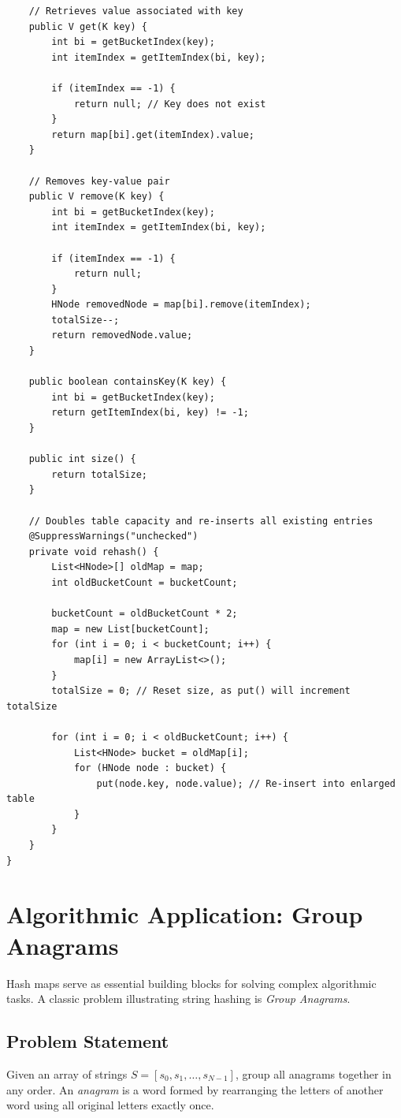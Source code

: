 \documentclass[10pt,journal,compsoc,onecolumn]{IEEEtran}
\begin{document}
\begin{verbatim}
    // Retrieves value associated with key
    public V get(K key) {
        int bi = getBucketIndex(key);
        int itemIndex = getItemIndex(bi, key);

        if (itemIndex == -1) {
            return null; // Key does not exist
        }
        return map[bi].get(itemIndex).value;
    }

    // Removes key-value pair
    public V remove(K key) {
        int bi = getBucketIndex(key);
        int itemIndex = getItemIndex(bi, key);

        if (itemIndex == -1) {
            return null;
        }
        HNode removedNode = map[bi].remove(itemIndex);
        totalSize--;
        return removedNode.value;
    }

    public boolean containsKey(K key) {
        int bi = getBucketIndex(key);
        return getItemIndex(bi, key) != -1;
    }

    public int size() {
        return totalSize;
    }

    // Doubles table capacity and re-inserts all existing entries
    @SuppressWarnings("unchecked")
    private void rehash() {
        List<HNode>[] oldMap = map;
        int oldBucketCount = bucketCount;

        bucketCount = oldBucketCount * 2;
        map = new List[bucketCount];
        for (int i = 0; i < bucketCount; i++) {
            map[i] = new ArrayList<>();
        }
        totalSize = 0; // Reset size, as put() will increment totalSize

        for (int i = 0; i < oldBucketCount; i++) {
            List<HNode> bucket = oldMap[i];
            for (HNode node : bucket) {
                put(node.key, node.value); // Re-insert into enlarged table
            }
        }
    }
}
\end{verbatim}

\section{Algorithmic Application: Group Anagrams}
\label{sec:group-anagrams}

Hash maps serve as essential building blocks for solving complex algorithmic tasks. A classic problem illustrating string hashing is \emph{Group Anagrams}.

\subsection{Problem Statement}
Given an array of strings $S = [s_0, s_1, \dots, s_{N-1}]$, group all anagrams together in any order. An \emph{anagram} is a word formed by rearranging the letters of another word using all original letters exactly once.
\end{document}
